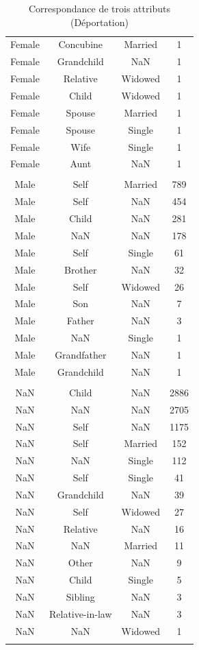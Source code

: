 \documentclass[a4paper,12pt,twoside]{book}
\begin{document}
\begin{longtable}{|c|c|c|c|}
                Female & Concubine & Married & 1 \\
                Female & Grandchild & NaN & 1 \\
                Female & Relative & Widowed & 1 \\
                Female & Child & Widowed & 1 \\
                Female & Spouse & Married & 1 \\
                Female & Spouse & Single & 1 \\
                Female & Wife & Single & 1 \\
                Female & Aunt & NaN & 1 \\\hline
                \multicolumn{4}{|c|}{} \\[-14pt]\hline
                Male & Self & Married & 789 \\
                Male & Self & NaN & 454 \\
                Male & Child & NaN & 281 \\
                Male & NaN & NaN & 178 \\
                Male & Self & Single & 61 \\
                Male & Brother & NaN & 32 \\
                Male & Self & Widowed & 26 \\
                Male & Son & NaN & 7 \\
                Male & Father & NaN & 3 \\
                Male & NaN & Single & 1 \\
                Male & Grandfather & NaN & 1 \\
                Male & Grandchild & NaN & 1 \\ \hline
                \multicolumn{4}{|c|}{} \\[-14pt]\hline
                NaN & Child & NaN & 2886 \\
                NaN & NaN & NaN & 2705 \\
                NaN & Self & NaN & 1175 \\
                NaN & Self & Married & 152 \\
                NaN & NaN & Single & 112 \\
                NaN & Self & Single & 41 \\
                NaN & Grandchild & NaN & 39 \\
                NaN & Self & Widowed & 27 \\
                NaN & Relative & NaN & 16 \\
                NaN & NaN & Married & 11 \\
                NaN & Other & NaN & 9 \\
                NaN & Child & Single & 5 \\
                NaN & Sibling & NaN & 3 \\
                NaN & Relative-in-law & NaN & 3 \\
                NaN & NaN & Widowed & 1 \\\hline
            \caption{Correspondance de trois attributs (Déportation)}
            \label{tab8bis}
            \end{longtable}
\end{document}
